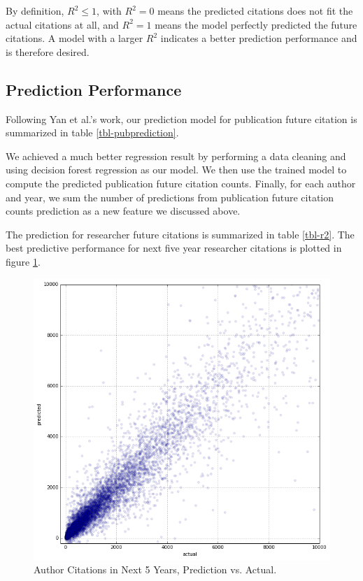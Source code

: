 By definition, $R^2 \leq 1$, with $R^2=0$ means the predicted citations does not fit the actual citations at all,
and $R^2=1$ means the model perfectly predicted the future citations. A model with a larger $R^2$ indicates a better prediction performance and is therefore desired. 
\subsection{Prediction Performance}
Following Yan et al.'s work, our prediction model for publication future citation is summarized in table \ref{tbl-pubprediction}.



We achieved a much better regression result by performing a data cleaning and using decision forest regression as our model. We then use the trained model to compute the predicted publication future citation counts. Finally, for each author and year, we sum the number of predictions from publication future citation counts prediction as a new feature we discussed above.

The prediction for researcher future citations is summarized in table \ref{tbl-r2}.
The best predictive performance for next five year researcher citations is plotted in figure \ref{author-prediction}.


\begin{figure}
    \centering
    \includegraphics[width=\columnwidth]{fig/author-prediction.png}
    \caption{Author Citations in Next 5 Years, Prediction vs. Actual.}
    \label{author-prediction}
\end{figure}

